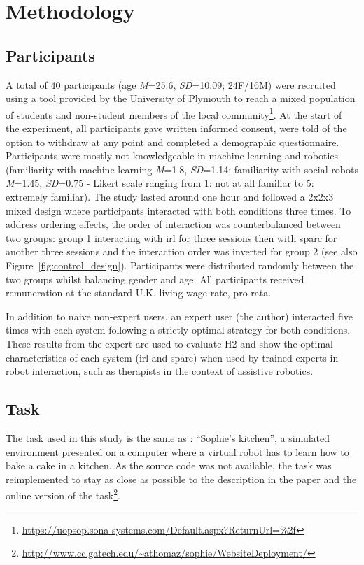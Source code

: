 \section{Methodology}

\subsection{Participants}

A total of 40 participants (age \textit{M}=25.6, \textit{SD}=10.09; 24F/16M) were recruited using a tool provided by the University of Plymouth to reach a mixed population of students and non-student members of the local community\footnote{\url{https://uopsop.sona-systems.com/Default.aspx?ReturnUrl=\%2f}}. At the start of the experiment, all participants gave written informed consent, were told of the option to withdraw at any point and completed a demographic questionnaire. Participants were mostly not knowledgeable in machine learning and robotics (familiarity with machine learning \textit{M}=1.8, \textit{SD}=1.14; familiarity with social robots \textit{M}=1.45, \textit{SD}=0.75 - Likert scale ranging from 1: not at all familiar to 5: extremely familiar). The study lasted around one hour and followed a 2x2x3 mixed design where participants interacted with both conditions three times. To address ordering effects, the order of interaction was counterbalanced between two groups: group 1 interacting with \gls{irl} for three sessions then with \gls{sparc} for another three sessions and the interaction order was inverted for group 2 (see also Figure~\ref{fig:control_design}). Participants were distributed randomly between the two groups whilst balancing gender and age. All participants received remuneration at the standard U.K. living wage rate, pro rata. 

In addition to naive non-expert users, an expert user (the author) interacted five times with each system following a strictly optimal strategy for both conditions. These results from the expert are used to evaluate H2 and show the optimal characteristics of each system (\gls{irl} and \gls{sparc}) when used by trained experts in robot interaction, such as therapists in the context of assistive robotics.

\subsection{Task} \label{ssec:control_task}

The task used in this study is the same as \cite{thomaz2008teachable}: ``Sophie's kitchen'', a simulated environment presented on a computer where a virtual robot has to learn how to bake a cake in a kitchen. As the source code was not available, the task was reimplemented to stay as close as possible to the description in the paper and the online version of the task\footnote{\url{http://www.cc.gatech.edu/~athomaz/sophie/WebsiteDeployment/}}.

